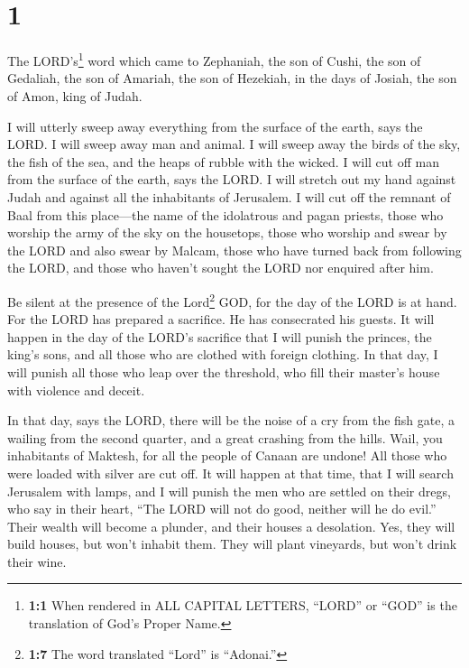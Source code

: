 \hypertarget{section}{%
\section{1}\label{section}}

 The LORD's\footnote{\textbf{1:1} When rendered in ALL
  CAPITAL LETTERS, ``LORD'' or ``GOD'' is the translation of God's
  Proper Name.} word which came to Zephaniah, the son of Cushi, the son
of Gedaliah, the son of Amariah, the son of Hezekiah, in the days of
Josiah, the son of Amon, king of Judah.

 I will utterly sweep away everything from the surface of
the earth, says the LORD.  I will sweep away man and
animal. I will sweep away the birds of the sky, the fish of the sea, and
the heaps of rubble with the wicked. I will cut off man from the surface
of the earth, says the LORD.  I will stretch out my hand
against Judah and against all the inhabitants of Jerusalem. I will cut
off the remnant of Baal from this place---the name of the idolatrous and
pagan priests,  those who worship the army of the sky on
the housetops, those who worship and swear by the LORD and also swear by
Malcam,  those who have turned back from following the
LORD, and those who haven't sought the LORD nor enquired after him.

 Be silent at the presence of the Lord\footnote{\textbf{1:7}
  The word translated ``Lord'' is ``Adonai.''} GOD, for the day of the
LORD is at hand. For the LORD has prepared a sacrifice. He has
consecrated his guests.  It will happen in the day of the
LORD's sacrifice that I will punish the princes, the king's sons, and
all those who are clothed with foreign clothing.  In that
day, I will punish all those who leap over the threshold, who fill their
master's house with violence and deceit.

 In that day, says the LORD, there will be the noise of a
cry from the fish gate, a wailing from the second quarter, and a great
crashing from the hills.  Wail, you inhabitants of
Maktesh, for all the people of Canaan are undone! All those who were
loaded with silver are cut off.  It will happen at that
time, that I will search Jerusalem with lamps, and I will punish the men
who are settled on their dregs, who say in their heart, ``The LORD will
not do good, neither will he do evil.''  Their wealth
will become a plunder, and their houses a desolation. Yes, they will
build houses, but won't inhabit them. They will plant vineyards, but
won't drink their wine.

